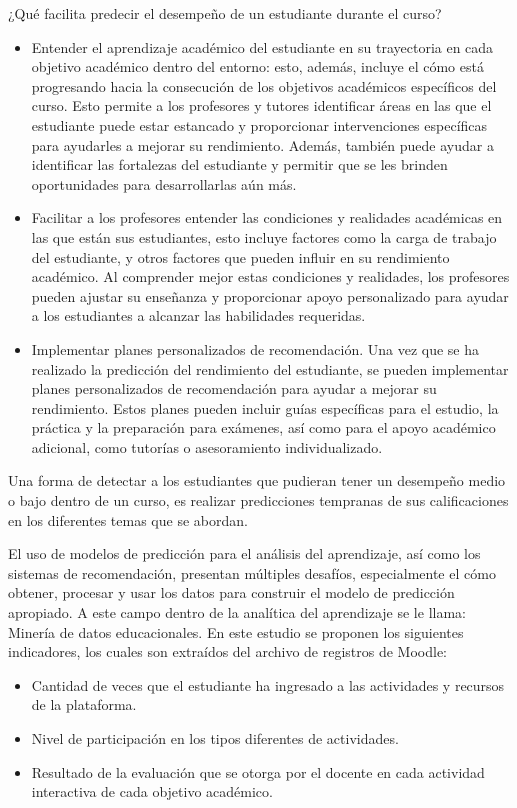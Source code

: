 ¿Qué facilita predecir el desempeño de un estudiante durante el curso?
\begin{itemize}

    \item Entender el aprendizaje académico del estudiante en su trayectoria en cada objetivo 
    académico dentro del entorno: esto, además, incluye el cómo está progresando hacia la consecución de 
    los objetivos académicos específicos del curso. Esto permite a los profesores y tutores identificar 
    áreas en las que el estudiante puede estar estancado y proporcionar intervenciones específicas para 
    ayudarles a mejorar su rendimiento. Además, también puede ayudar a identificar las fortalezas del 
    estudiante y permitir que se les brinden oportunidades para desarrollarlas aún más.

    \item Facilitar a los profesores entender las condiciones y realidades académicas 
    en las que están sus estudiantes, esto incluye factores como la carga de trabajo del estudiante, y otros factores que pueden influir en su 
    rendimiento académico. Al comprender mejor estas condiciones y realidades, los profesores 
    pueden ajustar su enseñanza y proporcionar apoyo personalizado para ayudar a los estudiantes 
    a alcanzar las habilidades requeridas.

    \item Implementar planes personalizados de recomendación. Una vez que se ha realizado la predicción 
    del rendimiento del estudiante, se pueden implementar planes personalizados de recomendación para 
    ayudar a mejorar su rendimiento. Estos planes pueden incluir guías específicas 
    para el estudio, la práctica y la preparación para exámenes, así como para el apoyo académico adicional, 
    como tutorías o asesoramiento individualizado.

\end{itemize}

Una forma de detectar a los estudiantes que pudieran tener un desempeño medio o bajo dentro de un curso, 
es realizar predicciones tempranas de sus calificaciones en los diferentes temas que se abordan.

El uso de modelos de predicción para el análisis del aprendizaje, así como los sistemas de recomendación, 
presentan múltiples desafíos, especialmente el cómo obtener, procesar y usar los datos para construir el modelo de 
predicción apropiado. A este campo dentro de la analítica del aprendizaje se le llama: Minería de datos educacionales. 
En este estudio se proponen los siguientes indicadores, los cuales son extraídos del archivo de registros de Moodle: 
\begin{itemize}
    \item Cantidad de veces que el estudiante ha ingresado a las actividades y recursos de la plataforma.
    \item Nivel de participación en los tipos diferentes de actividades.
    \item Resultado de la evaluación que se otorga por el docente en cada actividad interactiva de cada objetivo académico.
\end{itemize}

